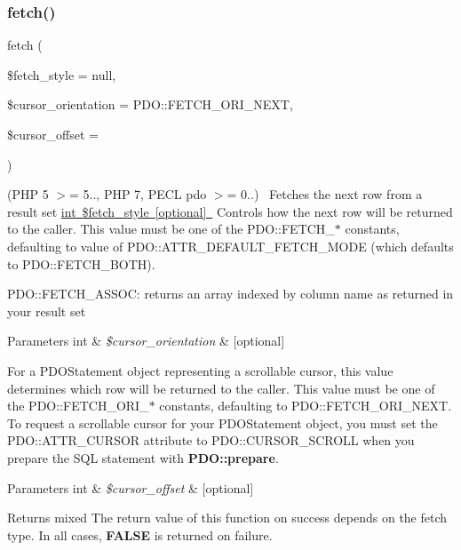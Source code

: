 \subsubsection{\texorpdfstring{fetch()}{fetch()}}
{\footnotesize\ttfamily fetch (\begin{DoxyParamCaption}\item[{}]{\$fetch\+\_\+style = {\ttfamily null},  }\item[{}]{\$cursor\+\_\+orientation = {\ttfamily PDO\+:\+:FETCH\+\_\+ORI\+\_\+NEXT},  }\item[{}]{\$cursor\+\_\+offset = {} }\end{DoxyParamCaption})}

(P\+HP 5 $>$= 5.., P\+HP 7, P\+E\+CL pdo $>$= 0..)~\newline
 Fetches the next row from a result set \mbox{\hyperlink{}{int \$fetch\+\_\+style \mbox{[}optional\mbox{]} }} Controls how the next row will be returned to the caller. This value must be one of the P\+D\+O\+::\+F\+E\+T\+C\+H\+\_\+$\ast$ constants, defaulting to value of P\+D\+O\+::\+A\+T\+T\+R\+\_\+\+D\+E\+F\+A\+U\+L\+T\+\_\+\+F\+E\+T\+C\+H\+\_\+\+M\+O\+DE (which defaults to P\+D\+O\+::\+F\+E\+T\+C\+H\+\_\+\+B\+O\+TH). 

P\+D\+O\+::\+F\+E\+T\+C\+H\+\_\+\+A\+S\+S\+OC\+: returns an array indexed by column name as returned in your result set 


\begin{DoxyParams}[1]{Parameters}
int & {\em \$cursor\+\_\+orientation} & \mbox{[}optional\mbox{]} \\
\hline
\end{DoxyParams}
For a P\+D\+O\+Statement object representing a scrollable cursor, this value determines which row will be returned to the caller. This value must be one of the P\+D\+O\+::\+F\+E\+T\+C\+H\+\_\+\+O\+R\+I\+\_\+$\ast$ constants, defaulting to P\+D\+O\+::\+F\+E\+T\+C\+H\+\_\+\+O\+R\+I\+\_\+\+N\+E\+XT. To request a scrollable cursor for your P\+D\+O\+Statement object, you must set the P\+D\+O\+::\+A\+T\+T\+R\+\_\+\+C\+U\+R\+S\+OR attribute to P\+D\+O\+::\+C\+U\+R\+S\+O\+R\+\_\+\+S\+C\+R\+O\+LL when you prepare the S\+QL statement with {\bfseries P\+D\+O\+::prepare}. 


\begin{DoxyParams}[1]{Parameters}
int & {\em \$cursor\+\_\+offset} & \mbox{[}optional\mbox{]} \\
\hline
\end{DoxyParams}
\begin{DoxyReturn}{Returns}
mixed The return value of this function on success depends on the fetch type. In all cases, {\bfseries F\+A\+L\+SE} is returned on failure. 
\end{DoxyReturn}


